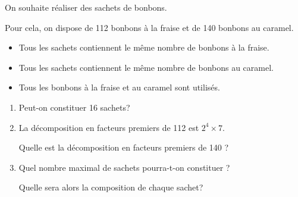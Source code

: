 \documentclass[exercice,a4]{thedocument}%
\begin{document}
%
\providecommand{\degres}{^\circ}%
On souhaite réaliser des sachets de bonbons.

Pour cela, on dispose de 112 bonbons à la fraise et de 140 bonbons au caramel.

\begin{itemize}[left=5mm]
	\item Tous les sachets contiennent le même nombre de bonbons à la fraise.

	\item Tous les sachets contiennent le même nombre de bonbons au caramel.

	\item Tous les bonbons à la fraise et au caramel sont utilisés.
\end{itemize}

\begin{enumerate}
	\item Peut-on constituer 16 sachets?

	\item La décomposition en facteurs premiers de 112 est $2^{4} \times 7$.

	Quelle est la décomposition en facteurs premiers de 140 ?

	\item Quel nombre maximal de sachets pourra-t-on constituer ?

	Quelle sera alors la composition de chaque sachet?
\end{enumerate}

\medskip
\showthesource
\end{document}
